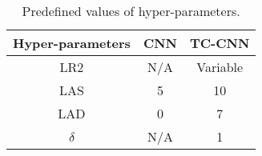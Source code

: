 \begin{table}[ht]
\label{tab:hyperparamsvals}
\begin{center}
\begin{tabular}{c|c|c}

Hyper-parameters & CNN & TC-CNN \\ 
\hline 
LR2 & N/A & Variable \\ 
\hline 
LAS & 5 & 10 \\ 
\hline 
LAD & 0 & 7 \\ 
\hline 
$\delta$ & N/A & 1 \\
\hline
\end{tabular} 
\caption{Predefined values of hyper-parameters.}
\end{center}
\end{table}


